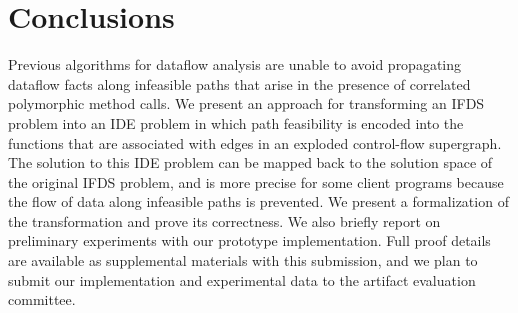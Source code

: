 \section{Conclusions}
  \label{sec:Conclusions}
  
Previous algorithms for dataflow analysis are unable to avoid propagating
dataflow facts along infeasible paths that arise in the presence of
correlated polymorphic method calls. 
% 
We present an approach for transforming an IFDS problem into an IDE problem
in which path feasibility is encoded into the functions that are associated
with edges in an exploded control-flow supergraph. The solution to this
IDE problem can be mapped back to the solution space of the original IFDS
problem, and is more precise for some client programs because the flow of data along
infeasible paths is prevented. We present a formalization of the
transformation and prove its correctness. We also briefly report on
preliminary experiments with our prototype implementation. Full proof
details are available as supplemental materials with this submission,
and we plan to submit our implementation and experimental data to the
artifact evaluation committee. 
  

